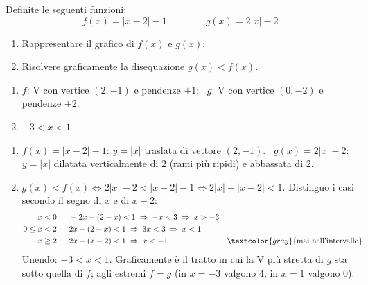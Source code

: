 
\begin{question}[ID=5.4, subtitle={Grafico e disequazione con $f(x)=|x-2|-1$ e $g(x)=2|x|-2$}, tags={trasformazioni geometriche, valore assoluto}, difficulty=media]
Definite le seguenti funzioni:
\[ f(x) = |x-2|-1 \qquad\qquad g(x) = 2|x|-2 \]
\begin{enumerate}
\item Rappresentare il grafico di $f(x)$ e $g(x)$;
\item Risolvere graficamente la disequazione $g(x) < f(x)$.
\end{enumerate}
\begin{solution}
\begin{enumerate}
    \item $f$: V con vertice $(2,-1)$ e pendenze $\pm1$; \ $g$: V con vertice $(0,-2)$ e pendenze $\pm2$.
    \item $-3<x<1$
\end{enumerate}
\begin{center}
\end{center}
\end{solution}
\begin{explanation}
\begin{enumerate}
    \item $f(x)=|x-2|-1$: $y=|x|$ traslata di vettore $(2,-1)$. \ $g(x)=2|x|-2$: $y=|x|$ dilatata verticalmente di $2$ (rami più ripidi) e abbassata di $2$.
    \item $g(x)<f(x) \iff 2|x|-2<|x-2|-1 \iff 2|x|-|x-2|<1$. Distinguo i casi secondo il segno di $x$ e di $x-2$:
    \[\begin{aligned}
    x<0: &\quad -2x-(2-x)<1 \;\Rightarrow\; -x<3 \;\Rightarrow\; x>-3\\
    0\leq x<2: &\quad 2x-(2-x)<1 \;\Rightarrow\; 3x<3 \;\Rightarrow\; x<1\\
    x\geq2: &\quad 2x-(x-2)<1 \;\Rightarrow\; x<-1 && \textcolor{gray}{\text{mai nell'intervallo}}
    \end{aligned}\]
    Unendo: $-3<x<1$. Graficamente è il tratto in cui la V più stretta di $g$ sta sotto quella di $f$; agli estremi $f=g$ (in $x=-3$ valgono $4$, in $x=1$ valgono $0$).
\end{enumerate}
\end{explanation}
\end{question}
